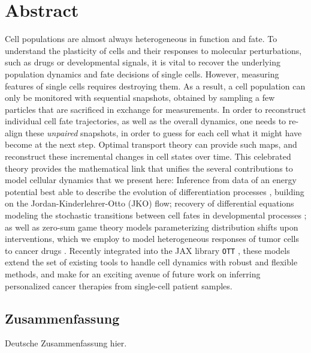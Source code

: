 \begingroup
\let\clearpage\relax
\let\cleardoublepage\relax
\let\cleardoublepage\relax

\chapter*{Abstract}

Cell populations are almost always heterogeneous in function and fate. To understand the plasticity of cells and their responses to molecular perturbations, such as drugs or developmental signals, it is vital to recover the underlying population dynamics and fate decisions of single cells. However, measuring features of single cells requires destroying them. As a result, a cell population can only be monitored with sequential snapshots, obtained by sampling a few particles that are sacrificed in exchange for measurements.
In order to reconstruct individual cell fate trajectories, as well as the overall dynamics, one needs to re-align these \emph{unpaired} snapshots, in order to guess for each cell what it might have become at the next step.
Optimal transport theory can provide such maps, and reconstruct these incremental changes in cell states over time. %
This celebrated theory provides the mathematical link that unifies the several contributions to model cellular dynamics that we present here: Inference from data of an energy potential best able to describe the evolution of differentiation processes \citep{bunne2022proximal}, building on the Jordan-Kinderlehrer-Otto (JKO) flow; recovery of differential equations modeling the stochastic transitions between cell fates in developmental processes \citep{bunne2022recovering}; as well as zero-sum game theory models parameterizing distribution shifts upon interventions, which we employ to model heterogeneous responses of tumor cells to cancer drugs \citep{bunne2021learning}.
Recently integrated into the JAX library \texttt{OTT} \citep{cuturi2022optimal}, these models extend the set of existing tools to handle cell dynamics with robust and flexible methods, and make for an exciting avenue of future work on inferring personalized cancer therapies from single-cell patient samples.
\endgroup

\cleardoublepage%

\begingroup
\let\clearpage\relax
\let\cleardoublepage\relax
\let\cleardoublepage\relax

\begin{otherlanguage}{ngerman}
\chapter*{Zusammenfassung}

Deutsche Zusammenfassung hier.

\end{otherlanguage}

\endgroup

\vfill